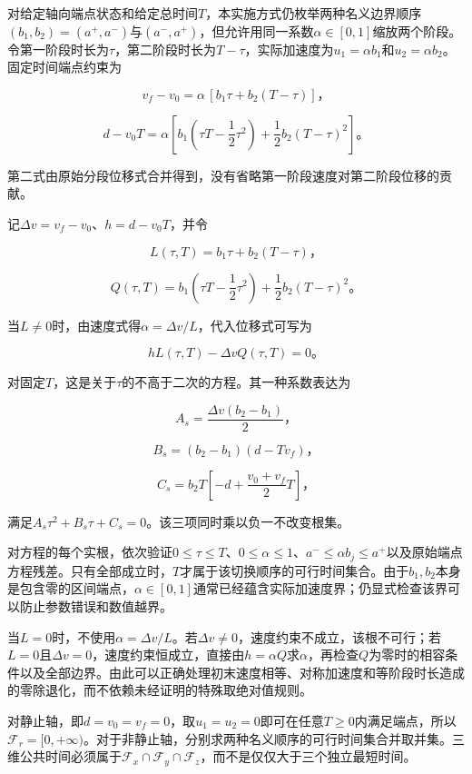 \documentclass[UTF8,a4paper,12pt,fontset=fandol]{ctexart}
\begin{document}
对给定轴向端点状态和给定总时间\(T\)，本实施方式仍枚举两种名义边界顺序\((b_1,b_2)=(a^+,a^-)\)与\((a^-,a^+)\)，但允许用同一系数\(\alpha\in[0,1]\)缩放两个阶段。令第一阶段时长为\(\tau\)，第二阶段时长为\(T-\tau\)，实际加速度为\(u_1=\alpha b_1\)和\(u_2=\alpha b_2\)。固定时间端点约束为

\[
v_f-v_0=\alpha\,[b_1\tau+b_2(T-\tau)]\text{，}
\]

\[
d-v_0T=\alpha\left[b_1\left(\tau T-\frac12\tau^2\right)
+\frac12b_2(T-\tau)^2\right]\text{。}
\]

第二式由原始分段位移式合并得到，没有省略第一阶段速度对第二阶段位移的贡献。

记\(\Delta v=v_f-v_0\)、\(h=d-v_0T\)，并令

\[
L(\tau,T)=b_1\tau+b_2(T-\tau)\text{，}
\]

\[
Q(\tau,T)=b_1\left(\tau T-\frac12\tau^2\right)
+\frac12b_2(T-\tau)^2\text{。}
\]

当\(L\ne0\)时，由速度式得\(\alpha=\Delta v/L\)，代入位移式可写为

\[
hL(\tau,T)-\Delta v Q(\tau,T)=0\text{。}
\]

对固定\(T\)，这是关于\(\tau\)的不高于二次的方程。其一种系数表达为

\[
A_s=\frac{\Delta v(b_2-b_1)}{2}\text{，}
\]

\[
B_s=(b_2-b_1)(d-Tv_f)\text{，}
\]

\[
C_s=b_2T\left[-d+\frac{v_0+v_f}{2}T\right]\text{，}
\]

满足\(A_s\tau^2+B_s\tau+C_s=0\)。该三项同时乘以负一不改变根集。

对方程的每个实根，依次验证\(0\le\tau\le T\)、\(0\le\alpha\le1\)、\(a^-\le\alpha b_j\le a^+\)以及原始端点方程残差。只有全部成立时，\(T\)才属于该切换顺序的可行时间集合。由于\(b_1,b_2\)本身是包含零的区间端点，\(\alpha\in[0,1]\)通常已经蕴含实际加速度界；仍显式检查该界可以防止参数错误和数值越界。

当\(L=0\)时，不使用\(\alpha=\Delta v/L\)。若\(\Delta v\ne0\)，速度约束不成立，该根不可行；若\(L=0\)且\(\Delta v=0\)，速度约束恒成立，直接由\(h=\alpha Q\)求\(\alpha\)，再检查\(Q\)为零时的相容条件以及全部边界。由此可以正确处理初末速度相等、对称加速度和等阶段时长造成的零除退化，而不依赖未经证明的特殊取绝对值规则。

对静止轴，即\(d=v_0=v_f=0\)，取\(u_1=u_2=0\)即可在任意\(T\ge0\)内满足端点，所以\(\mathcal F_r=[0,+\infty)\)。对于非静止轴，分别求两种名义顺序的可行时间集合并取并集。三维公共时间必须属于\(\mathcal F_x\cap\mathcal F_y\cap\mathcal F_z\)，而不是仅仅大于三个独立最短时间。
\end{document}
